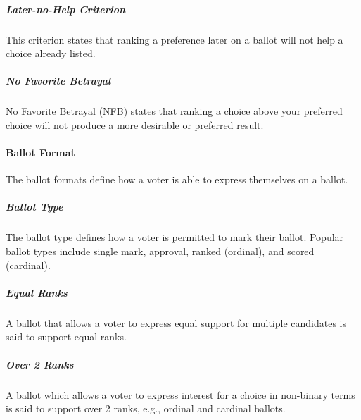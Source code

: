 \subparagraph{Later-no-Help Criterion}
This criterion states that ranking a preference later on a ballot will not help
a choice already listed.

\subparagraph{No Favorite Betrayal}
No Favorite Betrayal (NFB) states that ranking a choice above your preferred
choice will not produce a more desirable or preferred result.

\paragraph{Ballot Format}
The ballot formats define how a voter is able to express themselves on a ballot.\cite{electoral-handbook}

\subparagraph{Ballot Type}
The ballot type defines how a voter is permitted to mark their ballot. Popular
ballot types include single mark, approval, ranked (ordinal), and scored
(cardinal).

\subparagraph{Equal Ranks}
A ballot that allows a voter to express equal support for multiple candidates is
said to support equal ranks.

\subparagraph{Over 2 Ranks}
A ballot which allows a voter to express interest for a choice in non-binary
terms is said to support over 2 ranks, e.g., ordinal and cardinal ballots.

% 

